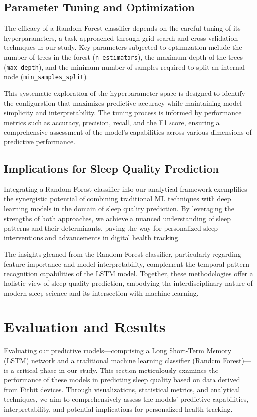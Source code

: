 \documentclass[10pt]{extarticle}
\begin{document}
\subsection{Parameter Tuning and Optimization}

The efficacy of a Random Forest classifier depends on the careful tuning of its hyperparameters, a task approached through grid search and cross-validation techniques in our study. Key parameters subjected to optimization include the number of trees in the forest (\texttt{n\_estimators}), the maximum depth of the trees (\texttt{max\_depth}), and the minimum number of samples required to split an internal node (\texttt{min\_samples\_split}).

This systematic exploration of the hyperparameter space is designed to identify the configuration that maximizes predictive accuracy while maintaining model simplicity and interpretability. The tuning process is informed by performance metrics such as accuracy, precision, recall, and the F1 score, ensuring a comprehensive assessment of the model's capabilities across various dimensions of predictive performance.

\subsection{Implications for Sleep Quality Prediction}

Integrating a Random Forest classifier into our analytical framework exemplifies the synergistic potential of combining traditional ML techniques with deep learning models in the domain of sleep quality prediction. By leveraging the strengths of both approaches, we achieve a nuanced understanding of sleep patterns and their determinants, paving the way for personalized sleep interventions and advancements in digital health tracking.

The insights gleaned from the Random Forest classifier, particularly regarding feature importance and model interpretability, complement the temporal pattern recognition capabilities of the LSTM model. Together, these methodologies offer a holistic view of sleep quality prediction, embodying the interdisciplinary nature of modern sleep science and its intersection with machine learning.

\section{Evaluation and Results}

Evaluating our predictive models---comprising a Long Short-Term Memory (LSTM) network and a traditional machine learning classifier (Random Forest)---is a critical phase in our study. This section meticulously examines the performance of these models in predicting sleep quality based on data derived from Fitbit devices. Through visualizations, statistical metrics, and analytical techniques, we aim to comprehensively assess the models' predictive capabilities, interpretability, and potential implications for personalized health tracking.
\end{document}
